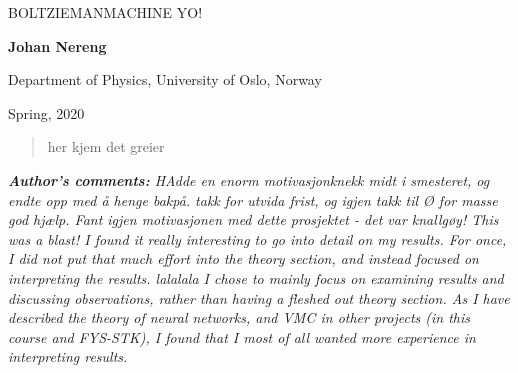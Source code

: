 \documentclass[%
oneside,                 %
final,                   %
10pt]{article}
\begin{document}

\newcommand{\exercisesection}[1]{\subsection*{#1}}






\thispagestyle{empty}

\begin{center}
{\LARGE\bf
\begin{spacing}{1.25}
BOLTZIEMANMACHINE YO!
\end{spacing}
}
\end{center}


\begin{center}
{\bf Johan Nereng}
\end{center}

    \begin{center}
\centerline{{\small Department of Physics, University of Oslo, Norway}}
\end{center}
    

\begin{center}
Spring, 2020
\end{center}

\vspace{3cm}
\vspace{3cm}
\begin{abstract}
her kjem det greier
\end{abstract}


\newpage


\textit{\textbf{Author's comments:} HAdde en enorm motivasjonknekk midt i smesteret, og endte opp med å henge bakpå. takk for utvida frist, og igjen takk til Ø for masse god hjælp. Fant igjen motivasjonen med dette prosjektet - det var knallgøy! 
This was a blast! I found it really interesting to go into detail on my results. For once, I did not put that much effort into the theory section, and instead focused on interpreting the results. lalalala
I chose to mainly focus on examining results and discussing observations, rather than having a fleshed out theory section. As I have described the theory of neural networks, and VMC in other projects (in this course and FYS-STK), I found that I most of all wanted more experience in interpreting results.}
\newpage
\end{document}
